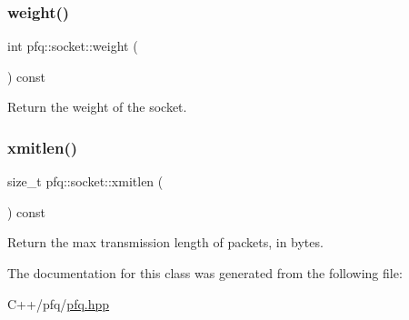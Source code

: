 \mbox{\label{classpfq_1_1socket_a8c596af298aaae176a64647ba04f51ff}} 
\subsubsection{\texorpdfstring{weight()}{weight()}\hspace{0.1cm}{\footnotesize\ttfamily [2/2]}}
{\footnotesize\ttfamily int pfq\+::socket\+::weight (\begin{DoxyParamCaption}{ }\end{DoxyParamCaption}) const\hspace{0.3cm}{\ttfamily [inline]}}



Return the weight of the socket. 

\mbox{\label{classpfq_1_1socket_a142d9760fcef01b426c3afb4005400d9}} 
\subsubsection{\texorpdfstring{xmitlen()}{xmitlen()}}
{\footnotesize\ttfamily size\+\_\+t pfq\+::socket\+::xmitlen (\begin{DoxyParamCaption}{ }\end{DoxyParamCaption}) const\hspace{0.3cm}{\ttfamily [inline]}}



Return the max transmission length of packets, in bytes. 



The documentation for this class was generated from the following file\+:\begin{DoxyCompactItemize}
\item 
C++/pfq/\hyperlink{pfq_8hpp}{pfq.\+hpp}\end{DoxyCompactItemize}
